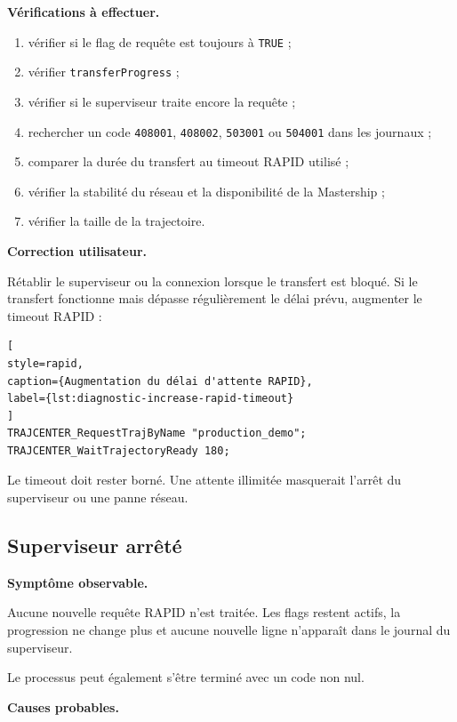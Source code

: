 \documentclass{rapportENSAM}
\begin{document}
\textbf{Vérifications à effectuer.}

\begin{enumerate}
\item vérifier si le flag de requête est toujours à \texttt{TRUE} ;
\item vérifier \texttt{transferProgress} ;
\item vérifier si le superviseur traite encore la requête ;
\item rechercher un code \texttt{408001}, \texttt{408002},
\texttt{503001} ou \texttt{504001} dans les journaux ;
\item comparer la durée du transfert au timeout RAPID utilisé ;
\item vérifier la stabilité du réseau et la disponibilité de la
Mastership ;
\item vérifier la taille de la trajectoire.
\end{enumerate}

\textbf{Correction utilisateur.}

Rétablir le superviseur ou la connexion lorsque le transfert est bloqué. Si le
transfert fonctionne mais dépasse régulièrement le délai prévu, augmenter le
timeout RAPID :

\begin{lstlisting}[
style=rapid,
caption={Augmentation du délai d'attente RAPID},
label={lst:diagnostic-increase-rapid-timeout}
]
TRAJCENTER_RequestTrajByName "production_demo";
TRAJCENTER_WaitTrajectoryReady 180;
\end{lstlisting}

Le timeout doit rester borné. Une attente illimitée masquerait l'arrêt du
superviseur ou une panne réseau.

\subsection{Superviseur arrêté}
\label{subsec:diagnostic-supervisor-stopped}

\textbf{Symptôme observable.}

Aucune nouvelle requête RAPID n'est traitée. Les flags restent actifs, la
progression ne change plus et aucune nouvelle ligne n'apparaît dans le journal
du superviseur.

Le processus peut également s'être terminé avec un code non nul.

\textbf{Causes probables.}
\end{document}
